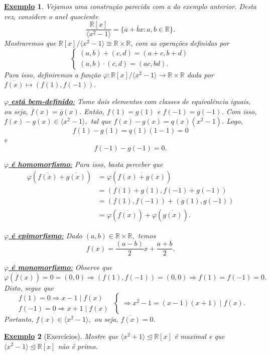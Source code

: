 \documentclass{article}
\newtheorem{example}{\underline{Exemplo}}
\begin{document}
\begin{example}
  Vejamos uma construção parecida com a do exemplo anterior. Desta vez, considere o anel quociente 
  \[
    \frac{\mathbb{R}[x]}{\langle x^{2}-1 \rangle} = \{\overline{a}+\overline{b}x:a, b\in \mathbb{R}\}.
  \]
  Mostraremos que \(\mathbb{R}[x]/\langle x^{2}-1 \rangle\cong{\mathbb{R}\times \mathbb{R}}\), com as operações definidas por
  \[
    \left\{\begin{array}{ll}
        (a, b) + (c, d) = (a + c, b + d)\\
        (a, b) \cdot (c, d) = (ac, bd).
    \end{array}\right.
  \]
  Para isso, definiremos a função \(\varphi :\mathbb{R}[x]/\langle x^{2}-1 \rangle\rightarrow \mathbb{R}\times \mathbb{R}\) dada por \(\overline{f(x)}\mapsto (f(1), f(-1)).\)

\underline{ \(\varphi \)\textbf{ está bem-definido}:} Tome dois elementos com classes de equivalência iguais, ou seja,
 \(\overline{f}(x) = \overline{g}(x)\). Então, \(f(1) = g(1) \) e \(f(-1) = g(-1)\). Com isso,
  \(f(x) - g(x)\in \langle x^{2} - 1 \rangle,\) tal que \(f(x) - g(x) = q(x)(x^{2}-1)\). Logo, 
  \[
    f(1) - g(1) = q(1)(1-1) = 0
  \]
e 
  \[
    f(-1)-g(-1) = 0.
  \]

\underline{\(\varphi\) \textbf{ é homomorfismo}:} Para isso, basta perceber que 
\begin{align*}
  \varphi (\overline{f(x)} + \overline{g(x)}) &= \varphi (\overline{f(x)+g(x)}) \\
                                              &= (f(1) + g(1), f(-1)+g(-1))\\
                                              &= (f(1), f(-1)) + (g(1), g(-1))\\
                                              &= \varphi (\overline{f(x)}) + \varphi (\overline{g(x)}).
\end{align*}

\underline{\(\varphi \)\textbf{ é epimorfismo}:} Dado \((a, b)\in \mathbb{R}\times \mathbb{R},\) temos 
  \[
    f(x) = \frac{(a-b)}{2}x + \frac{a+b}{2}. 
  \]

\underline{\(\varphi \)\textbf{ é monomorfismo}:} Observe que 
  \[
    \varphi (\overline{f}(x)) = 0 = (0, 0) \Rightarrow (f(1), f(-1)) = (0, 0) \Rightarrow f(1) = f(-1) = 0.
  \]
  Disto, segue que 
    \[
    \left.\begin{array}{ll}
          f(1) = 0 \Rightarrow x-1\mid f(x)\\
          f(-1) = 0 \Rightarrow x+1\mid f(x)
        \end{array}\right\{ \Rightarrow x^{2}-1 = (x-1)(x+1)\mid f(x).
    \]
Portanto, \(f(x)\in \langle x^{2}-1 \rangle,\) ou seja, \(\overline{f(x)} = 0.\)
\end{example}
\begin{example}[Exercícios]
  Mostre que \(\langle x^{2} + 1 \rangle \trianglelefteq \mathbb{R}[x]\) é maximal e que \(\langle x^{2}-1 \rangle \trianglelefteq \mathbb{R}[x]\) não é primo. 
\end{example}
\end{document}

